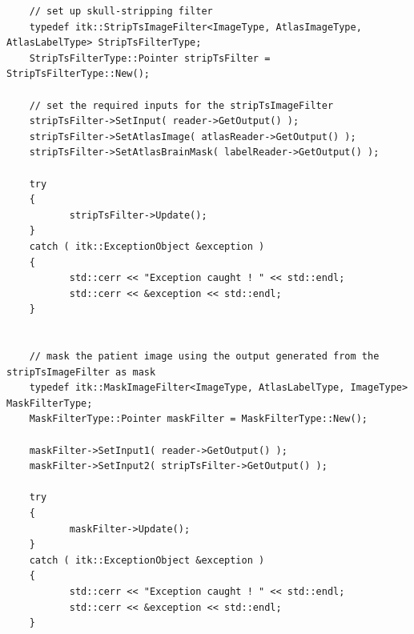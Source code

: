 \documentclass{InsightArticle}
\begin{document}
\small
\begin{verbatim}
	// set up skull-stripping filter
	typedef itk::StripTsImageFilter<ImageType, AtlasImageType, AtlasLabelType> StripTsFilterType;
	StripTsFilterType::Pointer stripTsFilter = StripTsFilterType::New();

	// set the required inputs for the stripTsImageFilter
	stripTsFilter->SetInput( reader->GetOutput() );
	stripTsFilter->SetAtlasImage( atlasReader->GetOutput() );
	stripTsFilter->SetAtlasBrainMask( labelReader->GetOutput() );

	try
	{
		   stripTsFilter->Update();
	}
	catch ( itk::ExceptionObject &exception )
	{
		   std::cerr << "Exception caught ! " << std::endl;
		   std::cerr << &exception << std::endl;
	}


	// mask the patient image using the output generated from the stripTsImageFilter as mask
	typedef itk::MaskImageFilter<ImageType, AtlasLabelType, ImageType> MaskFilterType;
	MaskFilterType::Pointer maskFilter = MaskFilterType::New();

	maskFilter->SetInput1( reader->GetOutput() );
	maskFilter->SetInput2( stripTsFilter->GetOutput() );

	try
	{
		   maskFilter->Update();
	}
	catch ( itk::ExceptionObject &exception )
	{
		   std::cerr << "Exception caught ! " << std::endl;
		   std::cerr << &exception << std::endl;
	}
\end{verbatim}
\normalsize

\newpage


%
%



\end{document}
